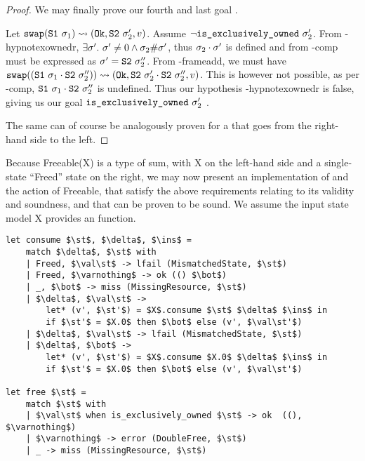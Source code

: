 \begin{proof}

We may finally prove our fourth and last goal .

\begin{hypvlist}
	 Let $\texttt{swap}(\texttt{S1}~\sigma_1)\rightsquigarrow(\texttt{Ok},\texttt{S2}~\sigma_2',v)$.
	 Assume $\neg\texttt{is\_exclusively\_owned}~\sigma_2'$.
	 From \hyp{hypnotexownedr}, $\exists \sigma'.~\sigma'\neq0 \land \sigma_2\#\sigma'$, thus $\sigma_2\cdot\sigma'$ is defined and from \hyp{comp} must be expressed as $\sigma'=\texttt{S2}~\sigma_2''$.
	 From \hyp{frameadd}, we must have $\texttt{swap}((\texttt{S1}~\sigma_1\cdot\texttt{S2}~\sigma_2''))\rightsquigarrow(\texttt{Ok},\texttt{S2}~\sigma_2'\cdot\texttt{S2}~\sigma_2'',v)$. This is however not possible, as per \hyp{comp}, $\texttt{S1}~\sigma_1\cdot\texttt{S2}~\sigma_2''$ is undefined. Thus our hypothesis \hyp{hypnotexownedr} is false, giving us our goal $\texttt{is\_exclusively\_owned}~\sigma_2'$ .

\end{hypvlist}

The same can of course be analogously proven for a \swap that goes from the right-hand side to the left.

\end{proof}

Because Freeable(X) is a type of sum, with X on the left-hand side and a single-state ``Freed'' state on the right, we may now present an implementation of  and the  action of Freeable, that satisfy the above requirements relating to its validity and soundness, and that can be proven to be sound. We assume the input state model X provides an \isexowned function.

\begin{lstlisting}
let consume $\st$, $\delta$, $\ins$ =
	match $\delta$, $\st$ with
	| Freed, $\val\st$ -> lfail (MismatchedState, $\st$)
	| Freed, $\varnothing$ -> ok (() $\bot$)
	| _, $\bot$ -> miss (MissingResource, $\st$)
	| $\delta$, $\val\st$ ->
		let* (v', $\st'$) = $X$.consume $\st$ $\delta$ $\ins$ in
		if $\st'$ = $X.0$ then $\bot$ else (v', $\val\st'$)
	| $\delta$, $\val\st$ -> lfail (MismatchedState, $\st$)
	| $\delta$, $\bot$ ->
		let* (v', $\st'$) = $X$.consume $X.0$ $\delta$ $\ins$ in
		if $\st'$ = $X.0$ then $\bot$ else (v', $\val\st'$)

let free $\st$ =
	match $\st$ with
	| $\val\st$ when is_exclusively_owned $\st$ -> ok  ((), $\varnothing$)
	| $\varnothing$ -> error (DoubleFree, $\st$)
	| _ -> miss (MissingResource, $\st$)
\end{lstlisting}

